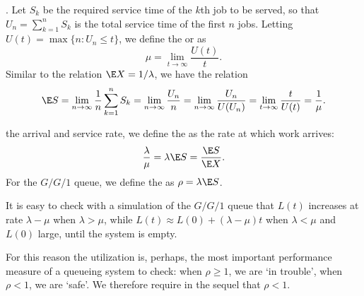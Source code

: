 .
Let $S_k$ be the required service time of the $k$th job to be served, so that $U_n = \sum_{k=1}^n S_k$ is the total service time of the first $n$ jobs.
Letting $ U(t) = \max\{n: U_n \leq t\}$, we define the  or  
as
\begin{equation*}
 \mu = \lim_{t\to\infty} \frac{U(t)}t.
\end{equation*}
Similar to the relation  $\E X= 1/\lambda$, we have the relation
\begin{equation*}
 \E S = \lim_{n\to\infty} \frac 1 n \sum_{k=1}^n S_k = \lim_{n\to\infty} \frac{U_n}{n} = \lim_{n\to\infty} \frac{U_n}{U(U_n)} = \lim_{t\to\infty} \frac t{U(t)} = \frac 1 \mu.
\end{equation*}




 the arrival and service rate, we define the  as  the rate at which work arrives: 
\begin{equation*}
\frac{\lambda}{\mu} = \lambda \E S = \frac{\E S}{\E X}.
\end{equation*}
For the $G/G/1$ queue, we define the  as $\rho=\lambda \E S$.

It is easy to check  with a simulation of the $G/G/1$ queue that $L(t)$ increases at rate $\lambda-\mu$ when $\lambda > \mu$, while $L(t) \approx L(0) + (\lambda - \mu)t$ when $\lambda< \mu$ and $L(0)$ large, until the system is empty.

For this reason the utilization is, perhaps, the most important performance measure of a queueing system to check: when $\rho\geq 1$, we are `in trouble', when $\rho < 1$, we are `safe'.
We therefore require in the sequel that $\rho<1$.



